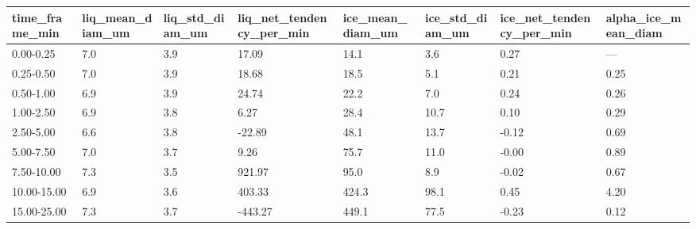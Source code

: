 \begin{tabular}{llllllll}
\toprule
time_frame_min & liq_mean_diam_um & liq_std_diam_um & liq_net_tendency_per_min & ice_mean_diam_um & ice_std_diam_um & ice_net_tendency_per_min & alpha_ice_mean_diam \\
\midrule
0.00-0.25 & 7.0 & 3.9 & 17.09 & 14.1 & 3.6 & 0.27 & — \\
0.25-0.50 & 7.0 & 3.9 & 18.68 & 18.5 & 5.1 & 0.21 & 0.25 \\
0.50-1.00 & 6.9 & 3.9 & 24.74 & 22.2 & 7.0 & 0.24 & 0.26 \\
1.00-2.50 & 6.9 & 3.8 & 6.27 & 28.4 & 10.7 & 0.10 & 0.29 \\
2.50-5.00 & 6.6 & 3.8 & -22.89 & 48.1 & 13.7 & -0.12 & 0.69 \\
5.00-7.50 & 7.0 & 3.7 & 9.26 & 75.7 & 11.0 & -0.00 & 0.89 \\
7.50-10.00 & 7.3 & 3.5 & 921.97 & 95.0 & 8.9 & -0.02 & 0.67 \\
10.00-15.00 & 6.9 & 3.6 & 403.33 & 424.3 & 98.1 & 0.45 & 4.20 \\
15.00-25.00 & 7.3 & 3.7 & -443.27 & 449.1 & 77.5 & -0.23 & 0.12 \\
\bottomrule
\end{tabular}
